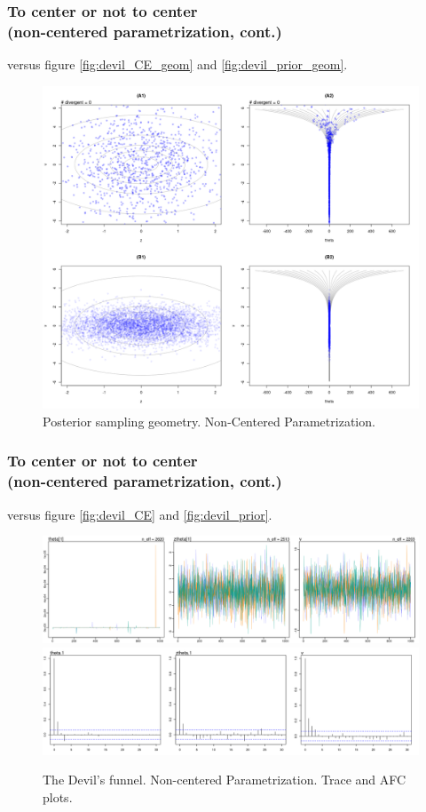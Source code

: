 \documentclass[nonav,sleutel]{beamer}
\begin{document}
	\begin{frame}
		\frametitle{To center or not to center \\
			(non-centered parametrization, cont.)}
		versus figure \ref{fig:devil_CE_geom} and \ref{fig:devil_prior_geom}.
		\begin{figure}[h]
			\centering
			\includegraphics[width=0.60\linewidth]{3_funnel_NC}
			\caption{Posterior sampling geometry. Non-Centered Parametrization.}
			\label{fig:devil_NC_geom}
		\end{figure}
	\end{frame}
	\begin{frame}
		\frametitle{To center or not to center \\
			(non-centered parametrization, cont.)}
		versus figure \ref{fig:devil_CE} and \ref{fig:devil_prior}.
		\begin{figure}[h] 
			\centering
			\includegraphics[width=0.85\linewidth]{3_trace_NC}
			\includegraphics[width=0.88\linewidth]{3_acf_NC}
			\caption{The Devil's funnel. Non-centered Parametrization. Trace and AFC plots.}
			\label{fig:devil_NC}
		\end{figure}
	\end{frame}
\end{document}
